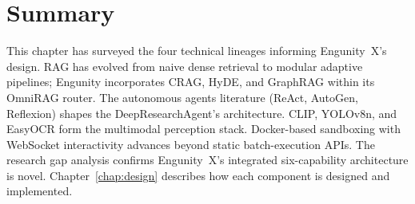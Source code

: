 \section{Summary}
\label{sec:litrev-summary}

This chapter has surveyed the four technical lineages informing Engunity~X's design. RAG has evolved from naive dense retrieval to modular adaptive pipelines; Engunity incorporates CRAG, HyDE, and GraphRAG within its OmniRAG router. The autonomous agents literature (ReAct, AutoGen, Reflexion) shapes the DeepResearchAgent's architecture. CLIP, YOLOv8n, and EasyOCR form the multimodal perception stack. Docker-based sandboxing with WebSocket interactivity advances beyond static batch-execution APIs. The research gap analysis confirms Engunity~X's integrated six-capability architecture is novel. Chapter~\ref{chap:design} describes how each component is designed and implemented.
